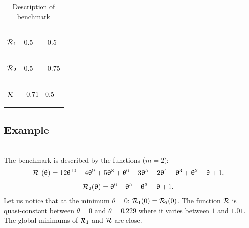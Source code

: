 \documentclass[article,authoryear,jmlmc]{beg_32}             %
\begin{document}
\begin{table}[h!]
	\centering
	\caption{Description of benchmark \exTwo}
	\begin{tabular}{lll}
		
		\begin{bf} \diagbox{Functions}{Minimums} \end{bf} & \begin{bf}\mg\end{bf} & \begin{bf}\ml\end{bf} \\
		
		
		\begin{bf}$\mathcal{R}_1$\end{bf} & 0.5 & -0.5  \\ 
		\begin{bf}$\mathcal{R}_2$\end{bf} & 0.5 & -0.75 \\ 
		\begin{bf}$\mathcal{R}$\end{bf}   & -0.71 & 0.5 \\ 
	\end{tabular}
	\label{ex2_example}
\end{table}

\subsection{Example \exThree}
~~\\
The benchmark is described by the functions ($m=2$):
\begin{equation*}
	\mathcal{R}_1(\uptheta) = 12\uptheta^{10}-4\uptheta^9+5\uptheta^8+\uptheta^6-3\uptheta^5-2\uptheta^4-\uptheta^3+\uptheta^2-\uptheta+1,
\end{equation*}
\begin{equation*}
	\mathcal{R}_2(\uptheta) = \uptheta^6-\uptheta^5-\uptheta^3+\uptheta+1.
\end{equation*}
Let us notice that at the minimum $\theta=0$: $\mathcal{R}_1(0)=\mathcal{R}_2(0)$. The function $\mathcal{R}$ is quasi-constant between $\theta=0$ and $\theta=0.229$ where it varies between $1$ and $1.01$. The global minimums of $\mathcal{R}_1$ and $\mathcal{R}$ are close.
\end{document}
